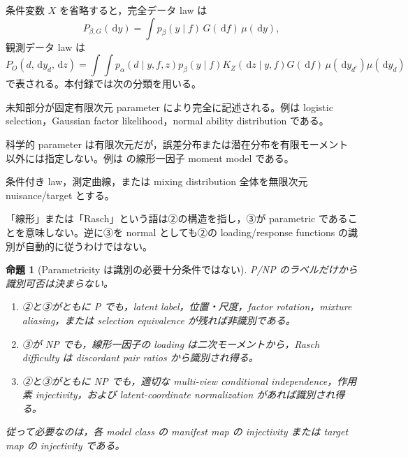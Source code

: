 \documentclass[11pt,a4paper]{ltjsarticle}
\newtheorem{proposition}{命題}[section]
\theoremstyle{remark}
\newcommand{\dd}{\,\mathrm d}
\begin{document}
条件変数 $X$ を省略すると，完全データ law は
\begin{equation}
 P_{\beta,G}(\dd y)
 =\int p_\beta(y\mid f)\,G(\dd f)\,\mu(\dd y),
\label{eq:threelevelmanifest}
\end{equation}
観測データ law は
\begin{equation}
 P_O(d,\dd y_d,\dd z)
 =\int\!\int
 p_\alpha(d\mid y,f,z)
 p_\beta(y\mid f)
 K_Z(\dd z\mid y,f)
 G(\dd f)\,\mu(\dd y_{d^c})\mu(\dd y_d)
\label{eq:threelevelobserved}
\end{equation}
で表される。本付録では次の分類を用いる。
\begin{description}[leftmargin=24mm,style=nextline]
\item[Parametric (P)] 未知部分が固定有限次元 parameter により完全に記述される。例は logistic selection，Gaussian factor likelihood，normal ability distribution である。
\item[Structural semiparametric (SP)] 科学的 parameter は有限次元だが，誤差分布または潜在分布を有限モーメント以外には指定しない。例は  の線形一因子 moment model である。
\item[Nonparametric (NP)] 条件付き law，測定曲線，または mixing distribution 全体を無限次元 nuisance/target とする。
\end{description}
「線形」または「Rasch」という語は②の構造を指し，③が parametric であることを意味しない。逆に③を normal としても②の loading/response functions の識別が自動的に従うわけではない。

\begin{proposition}[Parametricity は識別の必要十分条件ではない]
\label{prop:parametricitynotidentification}
P/NP のラベルだけから識別可否は決まらない。
\begin{enumerate}[label=(\roman*)]
\item ②と③がともに P でも，latent label，位置・尺度，factor rotation，mixture aliasing，または selection equivalence が残れば非識別である。
\item ③が NP でも，線形一因子の loading は二次モーメントから，Rasch difficulty は discordant pair ratios から識別され得る。
\item ②と③がともに NP でも，適切な multi-view conditional independence，作用素 injectivity，および latent-coordinate normalization があれば識別され得る。
\end{enumerate}
従って必要なのは，各 model class の manifest map の injectivity または target map の injectivity である。
\end{proposition}
\end{document}
